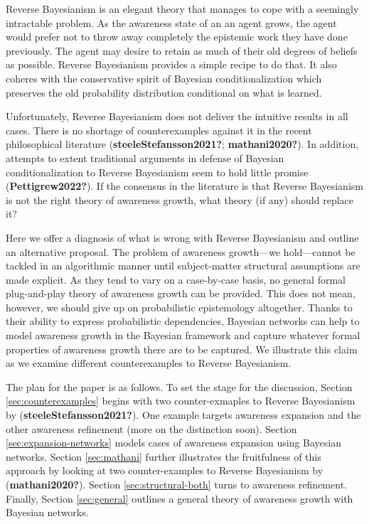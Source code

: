 \documentclass[
  letterpaper,
  DIV=11,
  numbers=noendperiod]{scrartcl}
\begin{document}
Reverse Bayesianism is an elegant theory that manages to cope with a
seemingly intractable problem. As the awareness state of an an agent
grows, the agent would prefer not to throw away completely the epistemic
work they have done previously. The agent may desire to retain as much
of their old degrees of beliefs as possible. Reverse Bayesianism
provides a simple recipe to do that. It also coheres with the
conservative spirit of Bayesian conditionalization which preserves the
old probability distribution conditional on what is learned.

Unfortunately, Reverse Bayesianism does not deliver the intuitive
results in all cases. There is no shortage of counterexamples against it
in the recent philosophical literature (\textbf{steeleStefansson2021?};
\textbf{mathani2020?}). In addition, attempts to extent traditional
arguments in defense of Bayesian conditionalization to Reverse
Bayesianism seem to hold little promise (\textbf{Pettigrew2022?}). If
the consensus in the literature is that Reverse Bayesianism is not the
right theory of awareness growth, what theory (if any) should replace
it?

Here we offer a diagnosis of what is wrong with Reverse Bayesianism and
outline an alternative proposal. The problem of awareness growth---we
hold---cannot be tackled in an algorithmic manner until subject-matter
structural assumptions are made explicit. As they tend to vary on a
case-by-case basis, no general formal plug-and-play theory of awareness
growth can be provided. This does not mean, however, we should give up
on probabilistic epistemology altogether. Thanks to their ability to
express probabilistic dependencies, Bayesian networks can help to model
awareness growth in the Bayesian framework and capture whatever formal
properties of awareness growth there are to be captured. We illustrate
this claim as we examine different counterexamples to Reverse
Bayesianism.

The plan for the paper is as follows. To set the stage for the
discussion, Section \ref{sec:counterexamples} begins with two
counter-exmaples to Reverse Bayesianism by
(\textbf{steeleStefansson2021?}). One example targets awareness
expansion and the other awareness refinement (more on the distinction
soon). Section \ref{sec:expansion-networks} models cases of awareness
expansion using Bayesian networks. Section \ref{sec:mathani} further
illustrates the fruitfulness of this approach by looking at two
counter-examples to Reverse Bayesianism by (\textbf{mathani2020?}).
Section \ref{sec:structural-both} turns to awareness refinement.
Finally, Section \ref{sec:general} outlines a general theory of
awareness growth with Bayesian networks.
\end{document}
